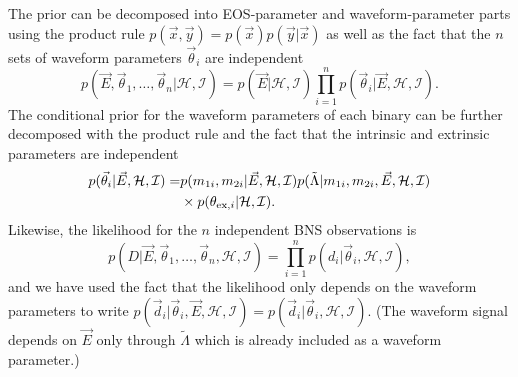 \documentclass[twocolumn,prd,amssymb,aps,nofootinbib,showpacs,epsf]{revtex4}
\begin{document}
The prior can be decomposed into EOS-parameter and waveform-parameter parts using the product rule $p(\vec x, \vec y) = p(\vec x) p(\vec y | \vec x) $ as well as the fact that the $n$ sets of waveform parameters $\vec\theta_i$ are independent
\begin{equation}
p(\vec E,\vec\theta_1,\dots,\vec\theta_n | \mathcal{H},\mathcal{I}) = p(\vec E | \mathcal{H},\mathcal{I}) \prod_{i=1}^n p(\vec\theta_i | \vec E, \mathcal{H},\mathcal{I}).
\end{equation} 
The conditional prior for the waveform parameters of each binary can be further decomposed with the product rule and the fact that the intrinsic and extrinsic parameters are independent
\begin{equation}
\begin{split}
p(\vec\theta_i | \vec E, \mathcal{H},\mathcal{I}) =& p(m_{1i}, m_{2i} | \vec E, \mathcal{H},\mathcal{I}) p(\tilde\Lambda | m_{1i}, m_{2i}, \vec E, \mathcal{H},\mathcal{I})\\
&\times p(\theta_{{\rm ex,}i} | \mathcal{H}, \mathcal{I}).
\end{split}
\end{equation}
Likewise, the likelihood for the $n$ independent BNS observations is
\begin{equation}
p(D | \vec E,\vec\theta_1,\dots,\vec\theta_n, \mathcal{H},\mathcal{I}) = \prod_{i=1}^n p(d_i | \vec\theta_i, \mathcal{H},\mathcal{I}),
\end{equation}
and we have used the fact that the likelihood only depends on the waveform parameters to write $p(\vec d_i | \vec\theta_i, \vec E,\mathcal{H},\mathcal{I}) = p(\vec d_i | \vec\theta_i,\mathcal{H},\mathcal{I})$. (The waveform signal depends on $\vec E$ only through $\tilde\Lambda$ which is already included as a waveform parameter.)
\end{document}
